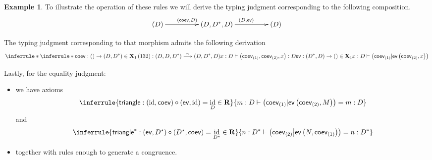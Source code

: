 \documentclass[pra,floatfix,
amsmath,superscriptaddress, 12pt]{article}
\theoremstyle{definition}
\newtheorem*{example}{Example}
\newcommand{\liso}{\overset{\sim}{\longrightarrow}}
\newcommand{\evmap}{\mathsf{ev}}
\newcommand{\coev}{\mathsf{coev}}
\newcommand{\msf}[1]{\mathsf{#1}}
\DeclareMathOperator{\id}{{\normalfont\text{id}}}
\begin{document}
\begin{example}
To illustrate the operation of these rules we will derive the typing judgment corresponding to the following composition.
\[
\xymatrixcolsep{4pc}\xymatrix{\left(D\right)\ar[r]^{\left(\coev,D\right)} & \left(D,D^{*},D\right)\ar[r]^{\left(D,\evmap\right)} & \left(D\right)}
\]

The typing judgment corresponding to that morphism admits the following derivation 
\[
\inferrule*{
    \inferrule*{
        \coev:() \rightarrow (D,D^*) \in \mathbf{X}_1
            \\
            \left(132\right):\left(D,D,D^{*}\right)\liso\left(D,D^{*},D\right)
    }{
        x:D\vdash\left(\coev_{\left(1\right)},\coev_{\left(2\right)},x\right):D
    }
        \\
        \evmap: (D^*,D) \rightarrow () \in \mathbf{X}_1
    }{
        x:D\vdash\left(\coev_{\left(1\right)}|\evmap\left(\coev_{\left(2\right)},x\right)\right)
    }
\]
\end{example}

Lastly, for the equality judgment:

\begin{itemize}
    \item we have axioms
        \[
            \inferrule{\msf{triangle}: (\id, \coev) \circ (\evmap, \id) = \id_{D}
                            \in
                                \mathbf{R}
                        }{
                            m:D \vdash \left(\coev_{\left(1\right)}|\evmap\left(\coev_{\left(2\right)},M\right)\right) = m:D
                        }
        \]
        and    
        \[
            \inferrule{
                            \mathsf{triangle}^{*}:(\evmap,D^\star)\circ(D^\star,\coev) = \id_{D^\star} \in \mathbf{R}
                        }{
                            n:D^{*}\vdash\left(\coev_{\left(2\right)} \middle| \evmap\left(N,\coev_{\left(1\right)}\right)\right)=n:D^{*}
                        }
        \]
    \item together with rules enough to generate a congruence.
\end{itemize}
\end{document}
